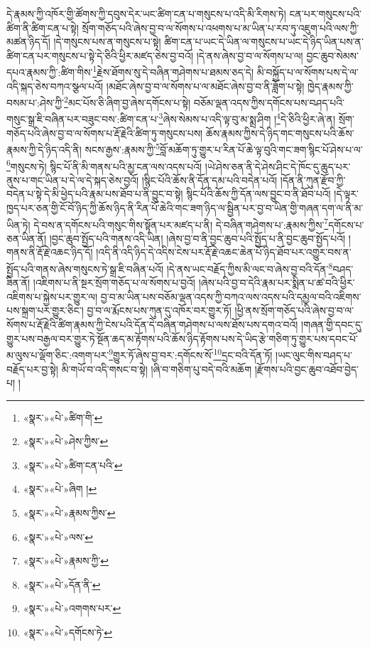 དེ་རྣམས་ཀྱི་འཁོར་གྱི་ཚོགས་ཀྱི་དབུས་དེར་ཡང་ཚིག་ངན་པ་གསུངས་པ་འདི་མི་རིགས་ཏེ། ངན་པར་གསུངས་པའི་ཚིག་ནི་ཚིག་ངན་པ་སྟེ། སྲོག་གཅོད་པའི་ཞེས་བྱ་བ་ལ་སོགས་པ་འཕགས་པ་མ་ཡིན་པ་རབ་ཏུ་འཇུག་པའི་ལས་ཀྱི་མཚན་ཉིད་དོ། །དེ་གསུངས་པས་ན་གསུངས་པ་སྟེ། ཚིག་ངན་པ་ཡང་དེ་ཡིན་ལ་གསུངས་པ་ཡང་དེ་ཉིད་ཡིན་པས་ན་ཚིག་ངན་པར་གསུངས་པ་སྟེ་དེ་ཅིའི་ཕྱིར་མཛད་ཅེས་བྱ་བའོ། །དེ་ནས་ཞེས་བྱ་བ་ལ་སོགས་པ་ལ། བྱང་ཆུབ་སེམས་དཔའ་རྣམས་ཀྱི་:ཚིག་གིས་\footnote{«སྣར་»«པེ་»ཚིག་གི་}རྗེས་ཐོགས་སུ་དེ་བཞིན་གཤེགས་པ་ཐམས་ཅད་དེ། མི་བསྐྱོད་པ་ལ་སོགས་པས་དེ་ལ་འདི་སྐད་ཅེས་བཀའ་སྩལ་པའོ། །མཐོང་ཞེས་བྱ་བ་ལ་སོགས་པ་ལ་མཐོང་ཞེས་བྱ་བ་ནི་ཟློག་པ་སྟེ། ཁྱེད་རྣམས་ཀྱི་བསམ་པ་:ཤེས་ཀྱི་\footnote{«སྣར་»«པེ་»ཤེས་ཀྱིས་}མང་པོས་ཅི་ཞིག་བྱ་ཞེས་དགོངས་པ་སྟེ། བཅོམ་ལྡན་འདས་ཀྱིས་དགོངས་པས་བཤད་པའི་གསུང་སྒྲ་ཇི་བཞིན་པར་བཟུང་བས་:ཚིག་ངན་པ་\footnote{«སྣར་»«པེ་»ཚིག་ངན་པའི་}ཞེས་སེམས་པ་འདི་ལྟ་བུ་མ་སྨྲ་ཤིག །\footnote{«སྣར་»«པེ་»ཞིག །}དེ་ཅིའི་ཕྱིར་ཞེ་ན། སྲོག་གཅོད་པའི་ཞེས་བྱ་བ་ལ་སོགས་པ་རྡོ་རྗེའི་ཚིག་ཏུ་གསུངས་པས། ཆོས་རྣམས་ཀྱིས་དེ་ཉིད་གང་གསུངས་པའི་ཆོས་རྣམས་ཀྱི་དེ་ཉིད་འདི་ནི། སངས་རྒྱས་:རྣམས་ཀྱི་\footnote{«སྣར་»«པེ་»རྣམས་ཀྱིས་}བློ་མཆོག་ཏུ་གྱུར་པ་རིན་པོ་ཆེ་ལྟ་བུའི་གང་ཟག་སྙིང་པོ་ཤེས་པ་ལ་\footnote{«སྣར་»«པེ་»ལས་}གསུངས་ཏེ། སྙིང་པོ་ནི་མི་གནས་པའི་མྱ་ངན་ལས་འདས་པའོ། །ཡེ་ཤེས་ཅན་ནི་དེ་ཤེས་ཤིང་དེ་ཁོང་དུ་ཆུད་པར་ནུས་པ་གང་ཡིན་པ་དེ་ལ་དེ་སྐད་ཅེས་བྱའོ། །སྙིང་པོའི་ཆོས་ནི་དོན་དམ་པའི་བདེན་པའོ། །དོན་ནི་ཀུན་རྫོབ་ཀྱི་བདེན་པ་སྟེ་དེ་མི་ཕྱེད་པའི་རྣམ་པས་ཐོབ་པ་ནི་བྱུང་བ་སྟེ། སྙིང་པོའི་ཆོས་ཀྱི་དོན་ལས་བྱུང་བ་ནི་ཐོབ་པའོ། །དེ་ལྟར་ཁྱད་པར་ཅན་གྱི་ངོ་བོ་ཉིད་ཀྱི་ཆོས་ཉིད་ནི་རིན་པོ་ཆེའི་གང་ཟག་ཉིད་ལ་སྦྱིན་པར་བྱ་བ་ཡིན་གྱི་གཞན་དག་ལ་ནི་མ་ཡིན་ཏེ། དེ་བས་ན་དགོངས་པའི་གསུང་གིས་སྟོན་པར་མཛད་པ་ནི། དེ་བཞིན་གཤེགས་པ་:རྣམས་ཀྱིས་\footnote{«སྣར་»«པེ་»རྣམས་ཀྱི་}དགོངས་པ་ཅན་ཡིན་ནོ། །བྱང་ཆུབ་སྤྱོད་པའི་གནས་འདི་ཡིན། །ཞེས་བྱ་བ་ནི་བྱང་ཆུབ་པའི་སྤྱོད་པ་ནི་བྱང་ཆུབ་སྤྱོད་པའོ། །གནས་ནི་རྡོ་རྗེ་འཆང་ཉིད་དོ། །འདི་ནི་འདི་ཉིད་དེ་འདིས་ངེས་པར་རྡོ་རྗེ་འཆང་ཆེན་པོ་ཉིད་ཐོབ་པར་འགྱུར་བས་ན་སྤྱོད་པའི་གནས་ཞེས་གསུངས་ཏེ་སྒྲ་ཇི་བཞིན་པའོ། །དེ་ནས་ཡང་བརྗོད་ཀྱིས་མི་ལང་བ་ཞེས་བྱ་བའི་དོན་\footnote{«སྣར་»«པེ་»དོན་ནི་}བཤད་ཟིན་ནོ། །འཇིགས་པ་ནི་སྔར་སྲོག་གཅོད་པ་ལ་སོགས་པ་བྱའོ། །ཞེས་པའི་བྱ་བ་དེའི་རྣམ་པར་སྨིན་པ་ཚ་བའི་ཕྱིར་འཇིགས་པ་སྐྱེས་པར་གྱུར་ལ། བྱ་བ་མ་ཡིན་པས་བཅོམ་ལྡན་འདས་ཀྱི་བཀའ་ལས་འདས་པའི་དམྱལ་བའི་འཇིགས་པས་སྐྲག་པར་གྱུར་ཅིང་། བྱ་བ་ལ་རྨོངས་པས་ཀུན་དུ་འཁོར་བར་གྱུར་ཏོ། །ཕྱི་ནས་སྲོག་གཅོད་པའི་ཞེས་བྱ་བ་ལ་སོགས་པ་རྡོ་རྗེའི་ཚིག་རྣམས་ཀྱི་ངེས་པའི་དོན་དེ་བཞིན་གཤེགས་པ་ལས་ཐོས་པས་དགའ་བའོ། །གཞན་གྱི་དབང་དུ་གྱུར་པས་བརྒྱལ་བར་གྱུར་ཏེ་སྔོན་ཆད་མ་རྟོགས་པའི་ཆོས་ཉིད་རྟོགས་པས་དེ་ཡིད་རྩེ་གཅིག་ཏུ་གྱུར་པས་དབང་པོ་མ་ལུས་པ་ལྡོག་ཅིང་:འགག་པར་\footnote{«སྣར་»«པེ་»འགགས་པར་}གྱུར་ཏོ་ཞེས་བྱ་བར་:དགོངས་སོ་\footnote{«སྣར་»«པེ་»དགོངས་ཏེ་}དྲང་བའི་དོན་ཏོ། །ཡང་ལུང་གིས་བཤད་པ་བརྗོད་པར་བྱ་སྟེ། མི་གཡོ་བ་འདི་གསང་བ་སྟེ། །ཞི་བ་གཅིག་པུ་བདེ་བའི་མཆོག །རྫོགས་པའི་བྱང་ཆུབ་འཐོབ་བྱེད་པ། །
